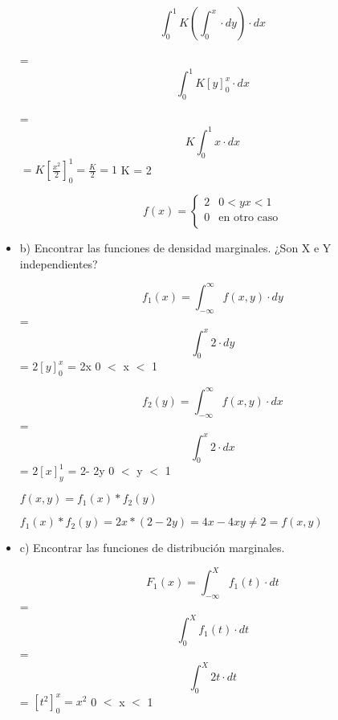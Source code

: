 \documentclass{../oxmathproblems}
\begin{document}
\begin{questions}
\begin{itemize}
 \begin{equation}
 \int _{0}^{1} K (\int _{0}^{x}  \cdot dy) \cdot dx
\end{equation} 

= \begin{equation}
 \int _{0}^{1} K [y]^x_0 \cdot dx
\end{equation} 

= 
\begin{equation}
K \int _{0}^{1}  x \cdot dx
\end{equation}
$
= K [\frac{x^2}{2}]^1_0 
= \frac{K}{2} = 1
$
K = 2

\[ 
f(x) = 
     \begin{cases}
        2  & 0  < {y}   
        {x} < 1 \\
       0 & \text{en otro caso} \\
     \end{cases}
\]

\item  b) Encontrar las funciones de densidad marginales. ¿Son X e Y independientes?


\begin{equation}
f_1(x)= \int _{-\infty}^{\infty} f(x,y)  \cdot dy
\end{equation} 
 = 
\begin{equation}
\int _{0}^{x} 2  \cdot dy
\end{equation} 
= $2[y]^x_0 $
= 2x      0 $<$ x $<$ 1 



\begin{equation}
f_2(y)= \int _{-\infty}^{\infty} f(x,y)  \cdot dx
\end{equation} 
 = 
\begin{equation}
\int _{0}^{x} 2  \cdot dx
\end{equation} 
= $2[x]^1_y $
= 2- 2y      0 $<$ y $<$ 1 

$f(x,y)= f_1(x)*f_2(y) $

$f_1(x)*f_2(y) = 2x*(2-2y) = 4x-4xy \neq 2 = f(x,y)$

\item  c) Encontrar las funciones de distribución marginales. 

\begin{equation}
F_1(x) = \int _{-\infty}^{X} f_1(t)  \cdot dt
\end{equation} 
= 
\begin{equation}
 \int _{0}^{X} f_1(t)  \cdot dt
\end{equation} 
= 
\begin{equation}
 \int _{0}^{X} 2t  \cdot dt
\end{equation} 
= $ [t^2]_0^x = x^2 $    0 $<$ x $<$ 1 




\end{itemize}
\end{questions}
\end{document}
